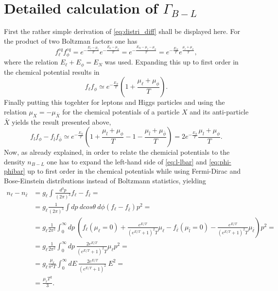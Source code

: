 \section{Detailed calculation of $\Gamma_{B-L}$}
\label{ap:Gamma_B-L}
First the rather simple derivation of \eqref{eq:distri_diff} shall be displayed here. For the product of two Boltzman factors one has
\begin{equation*}
f_\ell^{eq}f_\phi^{eq}=e^{-\frac{E_\ell-\mu_\ell}{T}}e^{-\frac{E_\phi-\mu_\phi}{T}}=e^{-\frac{E_N-\mu_\ell-\mu_\phi}{T}}=e^{-\frac{E_N}{T}}e^{\frac{\mu_\ell+\mu_\phi}{T}},
\end{equation*}
where the relation $E_{\ell}+E_{\phi}=E_{N}$ was used. \newline\indent
Expanding this up to first order in the chemical potential results in
\begin{equation*}
f_\ell f_\phi\simeq e^{-\frac{E_N}{T}}\left(1+\frac{\mu_\ell+\mu_\phi}{T}\right).
\end{equation*}
Finally putting this togehter for leptons and Higgs particles and using the relation $\mu_X=-\mu_{\bar{X}}$ for the chemical potentials of a particle $X$ and its anti-particle $\bar{X}$ yields the result presented above,
\begin{equation*}
f_lf_\phi-f_{\bar{l}}f_{\bar{\phi}}\simeq e^{-\frac{E_N}{T}}\left(1+\frac{\mu_l+\mu_\phi}{T}-1-\frac{\mu_{\bar{l}}+\mu_{\bar{\phi}}}{T}\right)=2e^{-\frac{E_N}{T}}\frac{\mu_l+\mu_\phi}{T}.
\end{equation*}
\newline\indent
Now, as already explained, in order to relate the chemicial potentials to the density $n_{B-L}$ one has to expand the left-hand side of \eqref{eq:l-lbar} and \eqref{eq:phi-phibar} up to first order in the chemical potentials while using Fermi-Dirac and Bose-Einstein distributions instead of Boltzmann statistics, yielding
\begin{align*}
	n_\ell-n_{\bar{\ell}}&=g_\ell\int\frac{d^3p}{\left(2\pi\right)^3}f_\ell-f_{\bar{\ell}}=\\
	&=g_\ell\frac{1}{\left(2\pi\right)^3}\int dp\:dcos\theta \:d\phi\left(f_\ell-f_{\bar{\ell}}\right)p^2=\\
	&=g_\ell\frac{1}{2\pi^2}\int_0^\infty dp \: \left(f_\ell\left(\mu_\ell=0\right)+\frac{e^{E/T}}{\left(e^{E/T}+1\right)^2T}\mu_\ell-f_{\bar{\ell}}\left(\mu_{\bar{l}}=0\right)-\frac{e^{E/T}}{\left(e^{E/T}+1\right)^2T}\mu_{\bar{\ell}}\right)p^2=\\
	&=g_\ell\frac{1}{2\pi^2}\int_0^\infty dp\: \frac{2e^{E/T}}{\left(e^{E/T}+1\right)^2T}\mu_\ell p^2=\\
	&=g_\ell\frac{\mu_\ell}{\pi^2T}\int_{0}^{\infty}dE\:\frac{2e^{E/T}}{\left(e^{E/T}+1\right)^2}\:E^2=\\
	&=\frac{\mu_\ell T^2}{3}.
\end{align*}
